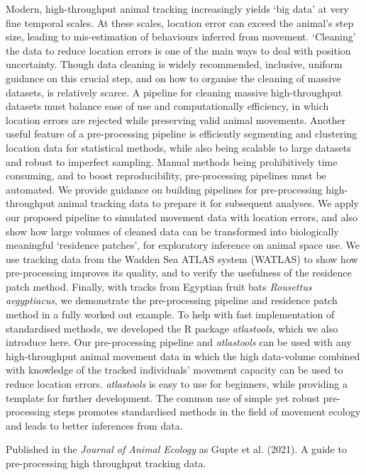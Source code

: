\footnotesize{
    Modern, high-throughput animal tracking increasingly yields `big data' at very fine temporal scales. 
    At these scales, location error can exceed the animal's step size, leading to mis-estimation of behaviours inferred from movement. 
    `Cleaning' the data to reduce location errors is one of the main ways to deal with position uncertainty. 
    Though data cleaning is widely recommended, inclusive, uniform guidance on this crucial step, and on how to organise the cleaning of massive datasets, is relatively scarce.
    A pipeline for cleaning massive high-throughput datasets must balance ease of use and computationally efficiency, in which location errors are rejected while preserving valid animal movements. 
    Another useful feature of a pre-processing pipeline is efficiently segmenting and clustering location data for statistical methods, while also being scalable to large datasets and robust to imperfect sampling. 
    Manual methods being prohibitively time consuming, and to boost reproducibility, pre-processing pipelines must be automated.
    We provide guidance on building pipelines for pre-processing high-throughput animal tracking data to prepare it for subsequent analyses. 
    We apply our proposed pipeline to simulated movement data with location errors, and also show how large volumes of cleaned data can be transformed into biologically meaningful `residence patches', for exploratory inference on animal space use. 
    We use tracking data from the Wadden Sea ATLAS system (WATLAS) to show how pre-processing improves its quality, and to verify the usefulness of the residence patch method. 
    Finally, with tracks from Egyptian fruit bats \textit{Rousettus aegyptiacus}, we demonstrate the pre-processing pipeline and residence patch method in a fully worked out example.
    To help with fast implementation of standardised methods, we developed the R package \textit{atlastools}, which we also introduce here. 
    Our pre-processing pipeline and \textit{atlastools} can be used with any high-throughput animal movement data in which the high data-volume combined with knowledge of the tracked individuals’ movement capacity can be used to reduce location errors. 
    \textit{atlastools} is easy to use for beginners, while providing a template for further development. 
    The common use of simple yet robust pre-processing steps promotes standardised methods in the field of movement ecology and leads to better inferences from data.

    \medskip

    \noindent {\large{\color{Maroon}$\Delta$}} Published in the \textit{Journal of Animal Ecology} as Gupte et al. (2021). A guide to pre-processing high throughput tracking data.
}

